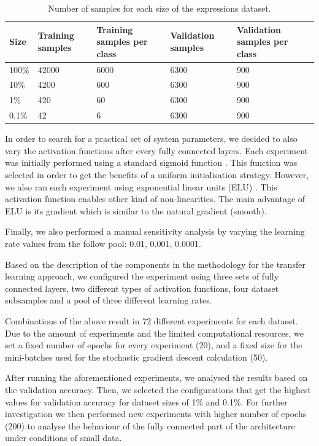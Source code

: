 \documentclass{article}
\begin{document}
\begin{table}[!htb]
  \centering
  \begin{tabular}{| l | l | l | l | l |}
    \hline
    \textbf{Size} & \textbf{Training samples} & \textbf{Training samples per class} & \textbf{Validation samples} & \textbf{Validation samples per class} \\ \hline
    100\% & 42000 & 6000 & 6300 & 900 \\ \hline
    10\% & 4200 & 600 & 6300 & 900 \\ \hline
    1\% & 420  & 60 & 6300 & 900 \\ \hline
    0.1\% & 42 & 6 & 6300 & 900 \\ \hline
  \end{tabular}
  \caption{Number of samples for each size of the expressions dataset.}
  \label{tab:ds_2}
\end{table}

In order to search for a practical set of system parameters, we decided to also vary the activation functions after every fully connected layers. Each experiment was initially performed using a standard sigmoid function \cite{hecht1992theory}. This function was selected in order to get the benefits of a uniform initialisation strategy. However, we also ran each experiment using exponential linear units (ELU) \cite{clevert2015fast}. This activation function enables other kind of non-linearities. The main advantage of ELU is its gradient which is similar to the natural gradient (smooth).

Finally, we also performed a manual sensitivity analysis by varying the learning rate values from the follow pool: 0.01, 0.001, 0.0001.

Based on the description of the components in the methodology for the transfer learning approach, we configured the experiment using three sets of fully connected layers, two different types of activation functions, four dataset subsamples and a pool of three different learning rates.

Combinations of the above result in 72 different experiments for each dataset. Due to the amount of experiments and the limited computational resources, we set a fixed number of epochs for every experiment (20), and a fixed size for the mini-batches used for the stochastic gradient descent calculation (50).

After running the aforementioned experiments, we analysed the results based on the validation accuracy. Then, we selected the configurations that get the highest values for validation accuracy for dataset sizes of 1\% and 0.1\%. For further investigation we then performed new experiments with higher number of epochs (200) to analyse the behaviour of the fully connected part of the architecture under conditions of small data.
\end{document}
